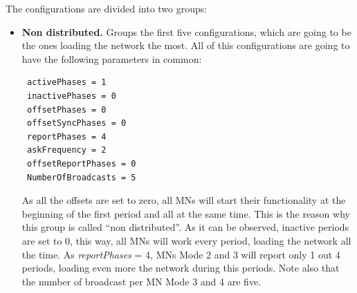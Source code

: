 The configurations are divided into two groups:

\begin{itemize}
 \item \textbf{Non distributed. }Groups the first five configurations, which are going to be the ones loading the network the most. All of this
configurations are going to have the following parameters in common:
\begin{verbatim}
 activePhases = 1
 inactivePhases = 0
 offsetPhases = 0
 offsetSyncPhases = 0
 reportPhases = 4 
 askFrequency = 2
 offsetReportPhases = 0
 NumberOfBroadcasts = 5
\end{verbatim}
As all the offsets are set to zero, all \acp{MN} will start their functionality at the beginning of the first period and all at the same
time. This is the reason why this group is called ``non distributed''. As it can be observed, inactive periods are set to 0, this way, all \acp{MN} will 
work every period, loading the network all the time. As \textit{reportPhases} = 4, \acp{MN} Mode 2 and 3 will report only 1 out 4 periods, loading even
more the network during this periods. Note also that the number of broadcast per \ac{MN} Mode 3 and 4 are five.


\end{itemize}
